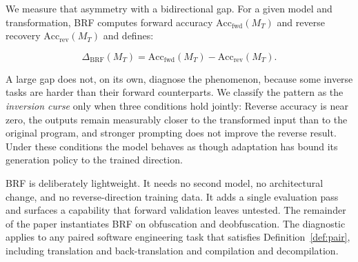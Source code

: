 We measure that asymmetry with a bidirectional gap. For a given model and
transformation, BRF computes forward accuracy
$\mathrm{Acc}_{\text{fwd}}(M_T)$ and reverse recovery
$\mathrm{Acc}_{\text{rev}}(M_T)$ and defines:

\begin{equation}
\Delta_{\text{BRF}}(M_T) = \mathrm{Acc}_{\text{fwd}}(M_T) - \mathrm{Acc}_{\text{rev}}(M_T).
\end{equation}

A large gap does not, on its own, diagnose the phenomenon, because some inverse
tasks are harder than their forward counterparts. We classify the pattern as the
\textit{inversion curse} only when three conditions hold jointly:  Reverse accuracy is near
zero, 
 the outputs remain measurably closer to the transformed input than to the
original program, and 
 stronger prompting does not improve the reverse result.
Under these conditions the model behaves as though adaptation has bound its
generation policy to the trained direction.

BRF is deliberately lightweight. It needs no second model, no architectural
change, and no reverse-direction training data. It adds a single evaluation pass
and surfaces a capability that forward validation leaves untested. The remainder
of the paper instantiates BRF on obfuscation and deobfuscation. The
diagnostic applies to any paired software engineering task that satisfies
Definition~\ref{def:pair}, including translation and back-translation and
compilation and decompilation.
